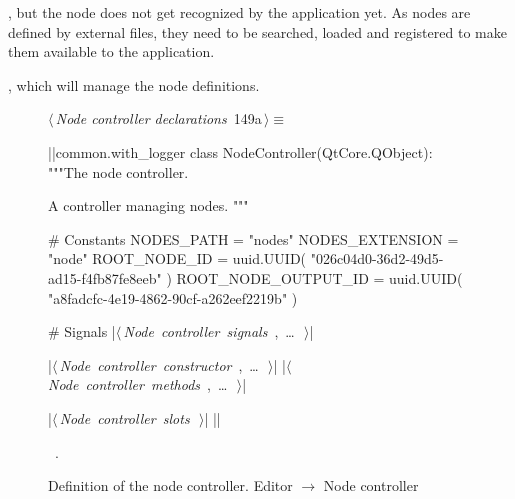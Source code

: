 \documentclass[%
    a4paper,    %
    justified,  %
    nobib,      %
    openany     %
]{tufte-book}
\makeatletter
\renewcommand{\label}[1]{\@tufte@label{##1}}%
\makeatother
\begin{document}
, but the node does not get
recognized by the application yet. As nodes are defined by external files, they
need to be searched, loaded and registered to make them available to the
application.

, which will manage the
node definitions.

\begin{figure}[!htbp]
\begin{flushleft} \small
\begin{minipage}{\linewidth}\label{scrap105}\raggedright\small
{} $\langle\,${\itshape Node controller declarations}\nobreak\ {\footnotesize {149a}}$\,\rangle\equiv$
\vspace{-1ex}
\begin{pythoncode}
|\normalfont{}\fontfamily{}|common.with_logger
class NodeController(QtCore.QObject):
    """The node controller.

    A controller managing nodes.
    """

    # Constants
    NODES_PATH = "nodes"
    NODES_EXTENSION = "node"
    ROOT_NODE_ID = uuid.UUID(
        "026c04d0-36d2-49d5-ad15-f4fb87fe8eeb"
    )
    ROOT_NODE_OUTPUT_ID = uuid.UUID(
        "a8fadcfc-4e19-4862-90cf-a262eef2219b"
    )

    # Signals
    |\hbox{$\langle\,${\itshape Node controller signals}\nobreak\ {\footnotesize {}, \ldots\ }$\,\rangle$}|

    |\hbox{$\langle\,${\itshape Node controller constructor}\nobreak\ {\footnotesize {}, \ldots\ }$\,\rangle$}|
    |\hbox{$\langle\,${\itshape Node controller methods}\nobreak\ {\footnotesize {}, \ldots\ }$\,\rangle$}|

    |\hbox{$\langle\,${\itshape Node controller slots}\nobreak\ {\footnotesize {}}$\,\rangle$}|
|\NWsep|
\end{pythoncode}
\vspace{1.5ex}
\footnotesize
\begin{list}{}{\setlength{\itemsep}{-\parsep}\setlength{\itemindent}{-\leftmargin}}
\item \NWtxtMacroRefIn\ .

\item{}
\end{list}
\end{minipage}\vspace{4ex}
\end{flushleft}
\caption{Definition of the node controller.
  \newline{}\newline{}Editor $\rightarrow$ Node controller}
\end{figure}
\end{document}
